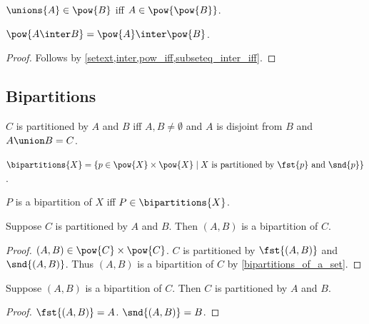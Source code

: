 \begin{proposition}\label{unions_elem_pow_iff}
    $\unions{A}\in\pow{B}$ iff $A\in\pow{\pow{B}}$.
\end{proposition}

\begin{proposition}\label{pow_inter}
    $\pow{A\inter B} = \pow{A}\inter\pow{B}$.
\end{proposition}
\begin{proof}
    Follows by \cref{setext,inter,pow_iff,subseteq_inter_iff}.
\end{proof}%



\subsection{Bipartitions}

\begin{abbreviation}\label{bipartitions}
    $C$ is partitioned by $A$ and $B$ iff $A,B\neq\emptyset$ and $A$ is disjoint from $B$ and $A\union B = C$.
\end{abbreviation}

\begin{definition}\label{bipartitions_of_a_set}
    $\bipartitions{X} = \{ p\in\pow{X}\times\pow{X}\mid \text{$X$ is partitioned by $\fst{p}$ and $\snd{p}$}\}$.
\end{definition}

\begin{abbreviation}\label{is_a_bipartition_of}
    $P$ is a bipartition of $X$ iff $P\in\bipartitions{X}$.
\end{abbreviation}

\begin{proposition}\label{bipartition_intro}
    Suppose $C$ is partitioned by $A$ and $B$.
    Then $(A, B)$ is a bipartition of $C$.
\end{proposition}
\begin{proof}
    $(A,B)\in\pow{C}\times\pow{C}$.
    $C$ is partitioned by $\fst{(A,B)}$ and $\snd{(A,B)}$.
    Thus $(A, B)$ is a bipartition of $C$ by \cref{bipartitions_of_a_set}.
\end{proof}

\begin{proposition}\label{bipartition_elim}
    Suppose $(A, B)$ is a bipartition of $C$.
    Then $C$ is partitioned by $A$ and $B$.
\end{proposition}
\begin{proof}
    $\fst{(A, B)} = A$.
    $\snd{(A, B)} = B$.
\end{proof}

